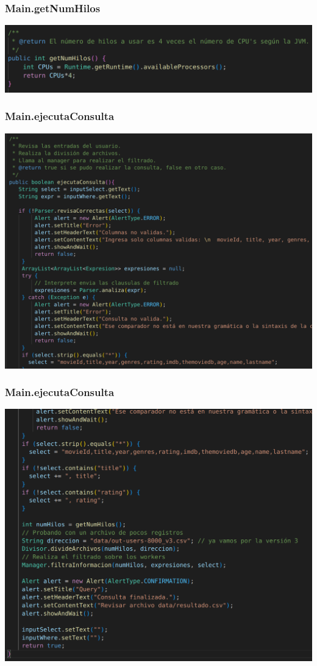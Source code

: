 \documentclass{beamer}
\begin{document}
\begin{frame}
\frametitle{Main.getNumHilos}

\includegraphics[width=\linewidth]{main_getnumhilos}

\end{frame}

\begin{frame}
\frametitle{Main.ejecutaConsulta}
\includegraphics[width=\linewidth]{main_ejecutaconsulta1}
\end{frame}

\begin{frame}
\frametitle{Main.ejecutaConsulta}
\includegraphics[width=\linewidth]{main_ejecutaconsulta2}
\end{frame}
\end{document}
